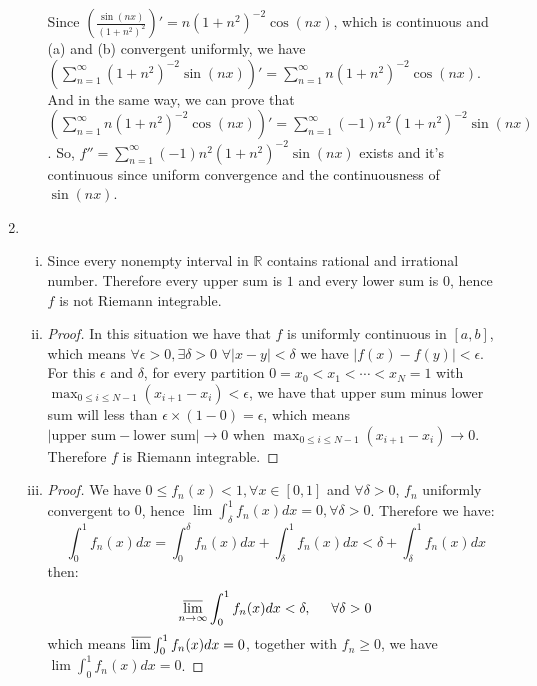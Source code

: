 \documentclass[11pt]{article}
\begin{document}
\begin{enumerate}[1]
\begin{enumerate}[(i)]
		Since $(\frac{\sin(n x)}{(1+n^2)^2})' = n (1+n^2)^{-2} \cos(n x)$, which is continuous and (a) and (b)
		convergent uniformly, we have $\left( \sum_{n=1}^{\infty} (1+n^2)^{-2} \sin(n x) \right)' = \sum_{n=1}^{\infty} n (1+n^2)^{-2} \cos(n x)$.
		And in the same way, we can prove that $\left( \sum_{n=1}^{\infty} n (1+n^2)^{-2} \cos(n x) \right)' = \sum_{n=1}^{\infty} (-1) n^2 (1+n^2)^{-2} \sin(n x)$.
		So, $f'' = \sum_{n=1}^{\infty} (-1) n^2 (1+n^2)^{-2} \sin(n x)$ exists and it's continuous since uniform convergence and the continuousness of $\sin (nx)$. 
	\end{enumerate}
	\item
	\begin{enumerate}[(i)]
		\item 
		Since every nonempty interval in $\mathbb{R}$ contains rational and irrational number. Therefore every upper sum is $1$ and every lower sum is $0$, hence $f$ is not Riemann integrable.
		\item
		\begin{proof}
			In this situation we have that $f$ is uniformly continuous in $[a,b]$, which means
			$\forall \epsilon > 0, \exists \delta > 0$ $\forall |x - y| < \delta$
			we have $|f(x) - f(y)| < \epsilon$. For this $\epsilon$ and $\delta$, for every partition
			$0 = x_0 < x_1 < \cdots < x_N = 1$  with $\max_{0 \le i \le N-1} (x_{i+1} - x_i) < \epsilon$,
			we have that upper sum minus lower sum will less than $\epsilon \times (1-0) = \epsilon$, which means
			$|\text{upper sum} - \text{lower sum}| \to 0$ when $\max_{0 \le i \le N-1} (x_{i+1} - x_i) \to 0$. 
			Therefore $f$ is Riemann integrable. 	
		\end{proof} 
		\item 
		\begin{proof}
			We have $0 \le f_n(x) < 1, \forall x \in [0,1]$ and $\forall \delta > 0$, $f_n$
			uniformly convergent to $0$, hence $\lim \int_\delta^1 f_n(x) d x = 0, \forall \delta > 0$.
			Therefore we have:
			$$\int_0^1 f_n(x) d x = \int_0^\delta f_n(x) d x + \int_\delta^1 f_n(x) d x < \delta + \int_\delta^1 f_n(x) d x$$
			then:
			$$\varlimsup_{n\to\infty} \int_0^1 f_n(x) d x < \delta, \hspace{0.5cm} \forall \delta > 0$$
			which means $\varlimsup \int_0^1 f_n(x) d x = 0$, together with $f_n \ge 0$,
			we have $\lim \int_0^1 f_n(x) d x = 0$.
		\end{proof} 
	\end{enumerate}
\end{enumerate}
\end{document}
